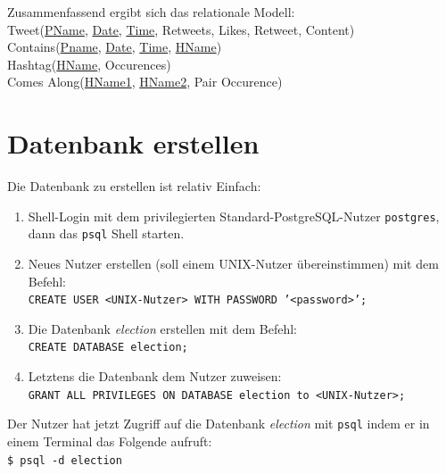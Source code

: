 \documentclass[paper=a4, english, ngerman, romanian]{scrartcl}
\begin{document}
	Zusammenfassend ergibt sich das relationale Modell: \\

	Tweet(\underline{PName}, \underline{Date}, \underline{Time}, Retweets, Likes, Retweet, Content)\\
	Contains(\underline{Pname}, \underline{Date}, \underline{Time}, \underline{HName})\\
	Hashtag(\underline{HName}, Occurences)\\
	Comes Along(\underline{HName1}, \underline{HName2}, Pair Occurence)   
	
	\section{Datenbank erstellen}
	
	Die Datenbank zu erstellen ist relativ Einfach:
	\begin{enumerate}
	\item Shell-Login mit dem privilegierten Standard-PostgreSQL-Nutzer \texttt{postgres}, dann das \texttt{psql} Shell starten.
	\item Neues Nutzer erstellen (soll einem UNIX-Nutzer übereinstimmen) mit dem Befehl: \\ 
		\texttt{CREATE USER <UNIX-Nutzer> WITH PASSWORD '<password>';}
	\item Die Datenbank \textit{election} erstellen mit dem Befehl: \\
		\texttt{CREATE DATABASE election;}
	\item Letztens die Datenbank dem Nutzer zuweisen: \\
		\texttt{GRANT ALL PRIVILEGES ON DATABASE election to <UNIX-Nutzer>;}
	\end{enumerate}
	Der Nutzer hat jetzt Zugriff auf die Datenbank \textit{election} mit \texttt{psql} indem er in einem Terminal das Folgende aufruft: \\
	\texttt{\$ psql -d election}
\end{document}
